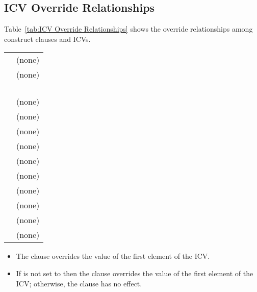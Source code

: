 \subsection{ICV Override Relationships}
\label{subsec:ICV Override Relationships}
Table~\ref{tab:ICV Override Relationships} shows the override relationships 
among construct clauses and ICVs.

\nolinenumbers
\renewcommand{\arraystretch}{1.5}
\tablelasttail{\hline}
\begin{supertabular}{ p{1.3in} p{2.0in}}
 & (none)\\
 & (none)\\
 & \\
 & \\
 & \\
 & \\
 & (none)\\
 & (none)\\
 & (none)\\
 & (none)\\
 & (none)\\
 & (none)\\
 & (none)\\
 & (none)\\
 & (none)\\
 & (none)\\
\end{supertabular}
\linenumbers

\descr
\begin{itemize}
\item The  clause overrides the value of the first element of the 
 ICV.

\item If  is not set to  then the  clause overrides the value of the 
first element of the  ICV; otherwise, the  clause has no effect. 
\end{itemize}

